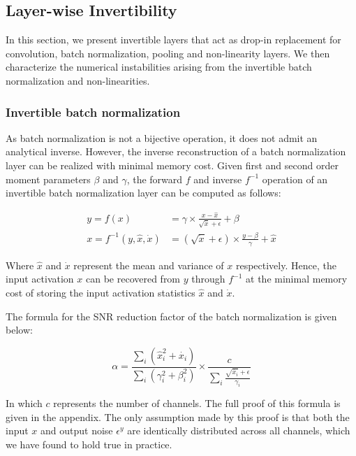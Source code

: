 \documentclass[twocolumn]{bmcart}
\begin{document}
\subsection{Layer-wise Invertibility}

In this section, we present invertible layers that act as drop-in replacement for convolution, batch normalization, pooling and non-linearity layers.
We then characterize the numerical instabilities arising from the invertible batch normalization and non-linearities.

\subsubsection{Invertible batch normalization}

As batch normalization is not a bijective operation, it does not admit an analytical inverse.
However, the inverse reconstruction of a batch normalization layer can be realized with minimal memory cost.
Given first and second order moment parameters $\beta$ and $\gamma$, the forward $f$ and inverse $f^{-1}$
operation of an invertible batch normalization layer can be computed as follows:

\begin{subequations}
\begin{align}
y = f(x) &= \gamma \times \frac{x - \hat{x}}{\sqrt{\dot{x}} + \epsilon} + \beta \\
x = f^{-1}(y, \hat{x}, \dot{x}) &= (\sqrt{\dot{x}} + \epsilon) \times \frac{y -  \beta}{\gamma}  + \hat{x}
\end{align}
\end{subequations}

Where $\hat{x}$ and $\dot{x}$ represent the mean and variance of $x$ respectively.
Hence, the input activation $x$ can be recovered from $y$ through $f^{-1}$ at the minimal memory cost
of storing the input activation statistics $\hat{x}$ and $\dot{x}$.

The formula for the SNR reduction factor of the batch normalization is given below:

\begin{equation}
\alpha = \frac{\sum_i (\hat{x}_i^2 + \dot{x_i})}{\sum_i (\gamma_i^2 + \beta_i^2)} \times \frac{c}{\sum_i \frac{\sqrt{\dot{x_i}}+\epsilon}{\gamma_i}}
\end{equation}

In which $c$ represents the number of channels. The full proof of this formula is given in the appendix.
The only assumption made by this proof is that both the input $x$ and output noise
$\epsilon^y$ are identically distributed across all channels,
which we have found to hold true in practice.
\end{document}
